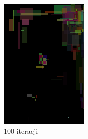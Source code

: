 \begin{figure}[!htb]
    \centering
    \begin{subfigure}[b]{0.3\textwidth}
        \centering
         \includegraphics[width=\textwidth]{images/mona/10000_300_2/img_0_it_100_best.png}
         \caption{100 iteracji}
    \end{subfigure}
    \begin{subfigure}[b]{0.3\textwidth}
        \centering

\end{subfigure}
\end{figure}
